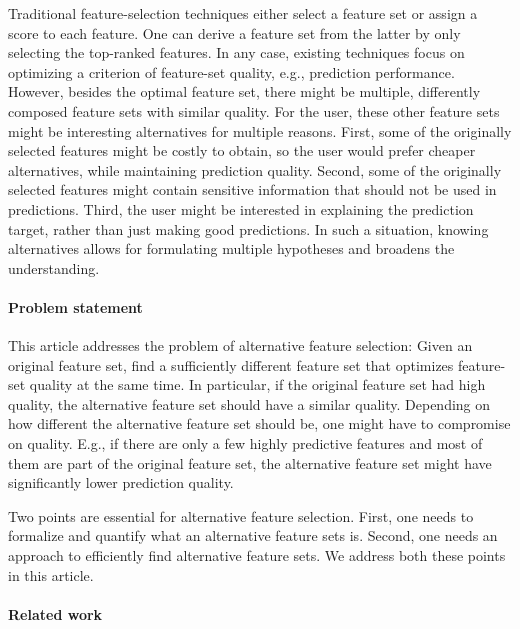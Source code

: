 \documentclass{article}
\theoremstyle{definition}
\begin{document}
Traditional feature-selection techniques either select a feature set or assign a score to each feature.
One can derive a feature set from the latter by only selecting the top-ranked features.
In any case, existing techniques focus on optimizing a criterion of feature-set quality, e.g., prediction performance.
However, besides the optimal feature set, there might be multiple, differently composed feature sets with similar quality.
For the user, these other feature sets might be interesting alternatives for multiple reasons.
First, some of the originally selected features might be costly to obtain, so the user would prefer cheaper alternatives, while maintaining prediction quality.
Second, some of the originally selected features might contain sensitive information that should not be used in predictions.
Third, the user might be interested in explaining the prediction target, rather than just making good predictions.
In such a situation, knowing alternatives allows for formulating multiple hypotheses and broadens the understanding.

\paragraph{Problem statement}

This article addresses the problem of alternative feature selection:
Given an original feature set, find a sufficiently different feature set that optimizes feature-set quality at the same time.
In particular, if the original feature set had high quality, the alternative feature set should have a similar quality.
Depending on how different the alternative feature set should be, one might have to compromise on quality.
E.g., if there are only a few highly predictive features and most of them are part of the original feature set, the alternative feature set might have significantly lower prediction quality.

Two points are essential for alternative feature selection.
First, one needs to formalize and quantify what an alternative feature sets is.
Second, one needs an approach to efficiently find alternative feature sets.
We address both these points in this article.

\paragraph{Related work}
\end{document}
